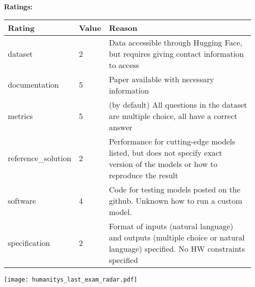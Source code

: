 {{{\bf Ratings:} ~ \\

\begin{tabular}{p{} p{} p{}}
\hline
Rating & Value & Reason \\
\hline
dataset & 2 & Data accessible through Hugging Face, but requires giving contact information to access
 \\
documentation & 5 & Paper available with necessary information
 \\
metrics & 5 & (by default) All questions in the dataset are multiple choice, all have a correct answer
 \\
reference\_solution & 2 & Performance for cutting-edge models listed, but does not specify exact version of the models or how to reproduce the result
 \\
software & 4 & Code for testing models posted on the github. Unknown how to run a custom model.
 \\
specification & 2 & Format of inputs (natural language) and outputs (multiple choice or natural language) specified. No HW constraints specified
 \\
\hline
\end{tabular}

\texttt{[image: humanitys\_last\_exam\_radar.pdf]}
}}
\clearpage